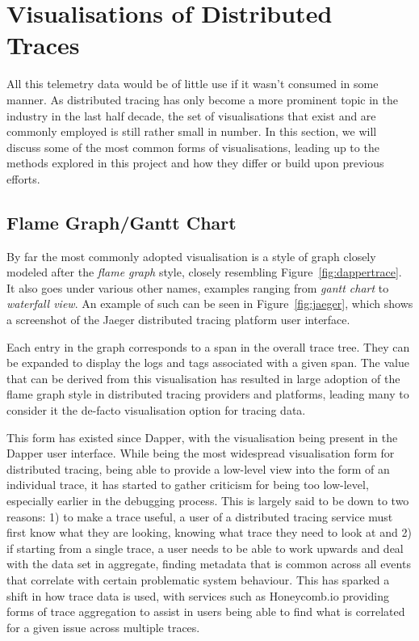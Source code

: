 \documentclass[12pt,pdftex,titlepage]{report}
\begin{document}
        \section{Visualisations of Distributed Traces}
            All this telemetry data would be of little use if it wasn't consumed in some manner. As distributed tracing has only become a more
            prominent topic in the industry in the last half decade, the set of visualisations that exist and are commonly employed is still rather
            small in number. In this section, we will discuss some of the most common forms of visualisations, leading up to the methods explored 
            in this project and how they differ or build upon previous efforts.
        
            \subsection{Flame Graph/Gantt Chart}
                By far the most commonly adopted visualisation is a style of graph closely modeled after the \textit{flame graph}\cite{lightsteptrace}
                \cite{datadogtrace} style, closely resembling Figure~\ref{fig:dappertrace}. It also goes under various other names, 
                examples ranging from \textit{gantt chart}\cite{yuritrace} to \textit{waterfall view}\cite{honeycombtrace}. An example of 
                such can be seen in Figure~\ref{fig:jaeger}, which shows a screenshot of the Jaeger distributed tracing platform user interface. 
                
                Each entry in the graph corresponds to a span in the overall trace tree. They can be expanded to display the logs and tags associated with a 
                given span. The value that can be derived from this visualisation has resulted in large adoption of the flame graph style in distributed 
                tracing providers and platforms, leading many to consider it the de-facto visualisation option for tracing data.

                This form has existed since Dapper, with the visualisation being present in the Dapper user interface. While being the most widespread visualisation
                form for distributed tracing, being able to provide a low-level view into the form of an individual trace, it has started to gather criticism for being
                too low-level, especially earlier in the debugging process. This is largely said to be down to two reasons: 1) to make a trace useful, a user of a distributed
                tracing service must first know what they are looking, knowing what trace they need to look at and 2) if starting from a single trace, a user needs to be able to work
                upwards and deal with the data set in aggregate, finding metadata that is common across all events that correlate with certain problematic system behaviour. This has
                sparked a shift in how trace data is used, with services such as Honeycomb.io providing forms of trace aggregation to assist in users being able to find what is 
                correlated for a given issue across multiple traces\cite{traceaggregate}.
        
\end{document}
